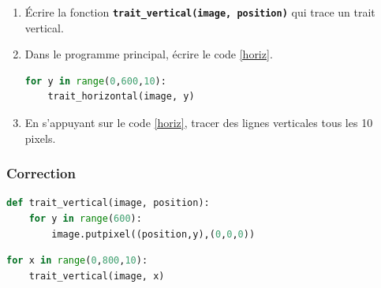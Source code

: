 \documentclass[svgnames,11pt]{beamer}
\begin{document}
\begin{frame}[fragile]
    \frametitle{}

    \begin{activite}
    \begin{enumerate}
        \item Écrire la fonction \textbf{\texttt{trait\_vertical(image, position)}} qui trace un trait vertical.
        \item Dans le programme principal, écrire le code \ref{horiz}.
\begin{center}
\begin{lstlisting}[language=Python , basicstyle=\ttfamily\small, xleftmargin=2em, xrightmargin=2em]
for y in range(0,600,10):
    trait_horizontal(image, y)
\end{lstlisting}
\label{horiz}
\end{center}
\item En s'appuyant sur le code \ref{horiz}, tracer des lignes verticales tous les 10 pixels.
    \end{enumerate}
    \end{activite}

\end{frame}
\begin{frame}[fragile]
    \frametitle{Correction}

\begin{center}
\begin{lstlisting}[language=Python , basicstyle=\ttfamily\small, xleftmargin=2em, xrightmargin=2em]
def trait_vertical(image, position):
    for y in range(600):
        image.putpixel((position,y),(0,0,0))
\end{lstlisting}
\end{center}
\begin{center}
\begin{lstlisting}[language=Python , basicstyle=\ttfamily\small, xleftmargin=2em, xrightmargin=2em]
for x in range(0,800,10):
    trait_vertical(image, x)
\end{lstlisting}
\end{center}

\end{frame}
\end{document}
